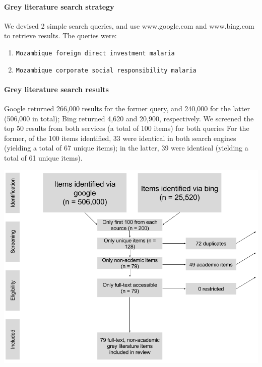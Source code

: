 \documentclass[]{article}
\providecommand{\tightlist}{%
  \setlength{\itemsep}{0pt}\setlength{\parskip}{0pt}}
\let\oldparagraph\paragraph
\renewcommand{\paragraph}[1]{\oldparagraph{#1}\mbox{}}
\begin{document}
\paragraph{Grey literature search
strategy}\label{grey-literature-search-strategy}

We devised 2 simple search queries, and use www.google.com and
www.bing.com to retrieve results. The queries were:

\begin{enumerate}
\def\labelenumi{\arabic{enumi}.}
\tightlist
\item
  \texttt{Mozambique\ foreign\ direct\ investment\ malaria}
\item
  \texttt{Mozambique\ corporate\ social\ responsibility\ malaria}
\end{enumerate}

\paragraph{Grey literature search
results}\label{grey-literature-search-results}

Google returned 266,000 results for the former query, and 240,000 for
the latter (506,000 in total); Bing returned 4,620 and 20,900,
respectively. We screened the top 50 results from both services (a total
of 100 items) for both queries For the former, of the 100 items
identified, 33 were identical in both search engines (yielding a total
of 67 unique items); in the latter, 39 were identical (yielding a total
of 61 unique items).

\begin{center}
\includegraphics[width=400pt]{img/prisma_grey.png}
\end{center}
\end{document}
